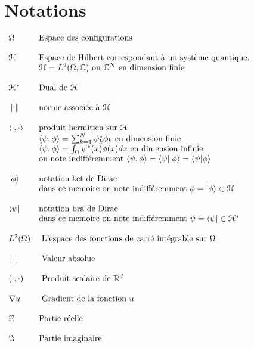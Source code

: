 \chapter*{Notations}
$
\begin{array}{ll}
\Omega & \mbox{Espace des configurations}\\\\
\mathcal{H} & \mbox{Espace de Hilbert correspondant à un système quantique.}\\
& \mathcal{H} = L^2(\Omega, \mathbb C) \mbox{ ou } \mathbb C^N  \mbox{ en dimension finie}\\\\
\mathcal{H^*} & \mbox{Dual de } \mathcal{H}\\\\
\lVert\cdot\rVert &  \mbox{norme associée à } \mathcal{H}\\\\
\langle\cdot,\cdot\rangle & \mbox{produit hermitien sur } \mathcal{H}\\
& \langle\psi,\phi\rangle=\sum_{k=1}^{N} \psi^*_k \phi_k \mbox{ en dimension finie}\\
& \langle\psi,\phi\rangle=\int_{\Omega} \psi^*(x) \phi(x) dx \mbox{ en dimension infinie}\\
&\mbox{on note indifféremment } \langle\psi,\phi\rangle = \langle\psi||\phi\rangle = \langle\psi|\phi\rangle\\\\
| \phi \rangle & \mbox{notation ket de Dirac}\\
& \mbox{dans ce memoire on note indifféremment } \phi = | \phi \rangle \in \mathcal{H}\\\\
\langle \psi | & \mbox{notation bra de Dirac}\\
& \mbox{dans ce memoire on note indifféremment } \psi = \langle  \psi | \in \mathcal{H^*}\\\\
L^2(\Omega) & \mbox{ L'espace des fonctions de carré intégrable sur } \Omega\\\\
|\cdot| & \mbox{ Valeur absolue}\\\\
\left(\cdot,\cdot \right) & \mbox{ Produit scalaire de }\mathbb{R}^d\\\\
\nabla u & \mbox{ Gradient de la fonction } u\\\\
\Re & \mbox{Partie réelle}\\\\
\Im & \mbox{Partie imaginaire}
\end{array}
$
